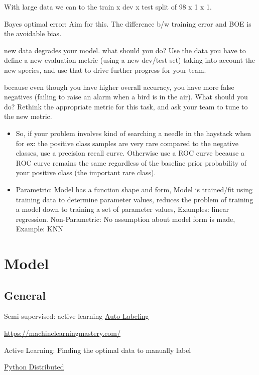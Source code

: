 \documentclass[]{book}
\begin{document}
With large data we can to the train x dev x test split of 98 x 1 x 1.

Bayes optimal error: Aim for this. The difference b/w training error and
BOE is the avoidable bias.

new data degrades your model. what should you do? Use the data you have
to define a new evaluation metric (using a new dev/test set) taking into
account the new species, and use that to drive further progress for your
team.

because even though you have higher overall accuracy, you have more
false negatives (failing to raise an alarm when a bird is in the air).
What should you do? Rethink the appropriate metric for this task, and
ask your team to tune to the new metric.

\begin{itemize}
\item
  So, if your problem involves kind of searching a needle in the
  haystack when for ex: the positive class samples are very rare
  compared to the negative classes, use a precision recall curve.
  Otherwise use a ROC curve because a ROC curve remains the same
  regardless of the baseline prior probability of your positive class
  (the important rare class).
\item
  Parametric: Model has a function shape and form, Model is trained/fit
  using training data to determine parameter values, reduces the problem
  of training a model down to training a set of parameter values,
  Examples: linear regression. Non-Parametric: No assumption about model
  form is made, Example: KNN
\end{itemize}

\section{Model}\label{model-2}

\subsection{General}\label{general-5}

Semi-supervised: active learning \textbar{}
\href{https://blog.fastforwardlabs.com/2018/09/28/snorkel-rapid-training-data-creation-with-weak-supervision.html}{Auto
Labeling}

\url{https://machinelearningmastery.com/}

Active Learning: Finding the optimal data to manually label

\href{https://speakerdeck.com/seanoc/a-tour-of-large-scale-data-analysis-tools-in-python}{Python
Distributed}
\end{document}

